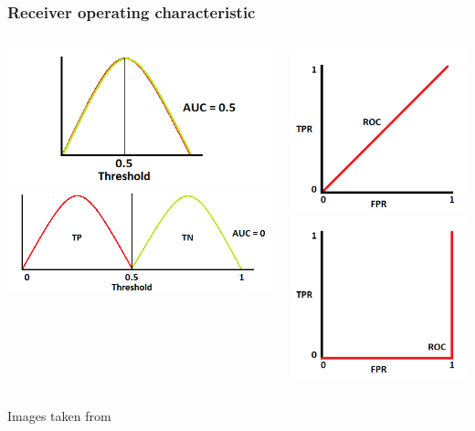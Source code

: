 \documentclass[compress]{beamer}
\begin{document}
\begin{frame}
\frametitle{Receiver operating characteristic}
\begin{columns}
\begin{center}
\includegraphics[width=1\linewidth]{Pic/ROC/ROC_C.png}
\includegraphics[width=1\linewidth]{Pic/ROC/ROC_D.png}\\
\end{center}
\begin{center}
\includegraphics[width=0.5\linewidth]{Pic/ROC/ROC_C_R.png}
\includegraphics[width=0.5\linewidth]{Pic/ROC/ROC_D_R.png}\\
\end{center}
\end{columns}
\begin{center}
Images taken from \cite{ROC_fig}
\end{center}
\end{frame}
\end{document}
